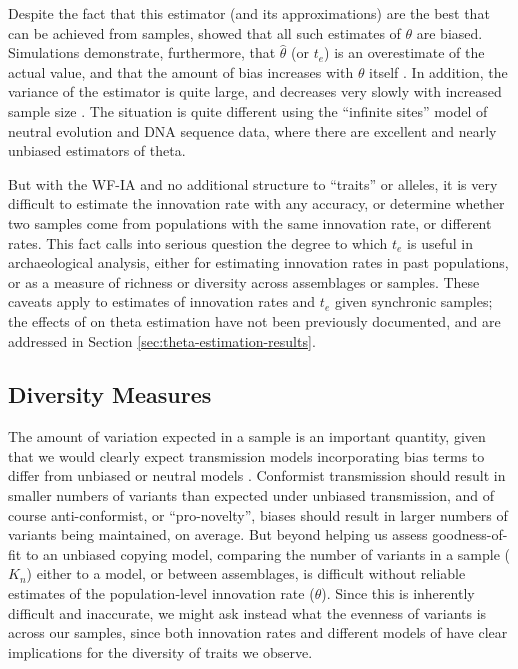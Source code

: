 Despite the fact that this estimator (and its approximations) are the best that can be achieved from samples, \citet{ewens1972sampling} showed that all such estimates of $\theta$ are biased.  Simulations demonstrate, furthermore, that $\hat{\theta}$ (or $t_e$) is an overestimate of the actual value, and that the amount of bias increases with $\theta$ itself \citep{ewens1974some}.   In addition, the variance of the estimator is quite large, and decreases very slowly with increased sample size \citep{durrett2008}.  The situation is quite different using the ``infinite sites'' model of neutral evolution and DNA sequence data, where there are excellent and nearly unbiased estimators of theta.  

But with the WF-IA and no additional structure to ``traits'' or alleles, it is very difficult to estimate the innovation rate with any accuracy, or determine whether two samples come from populations with the same innovation rate, or different rates.  This fact calls into serious question the degree to which $t_e$ is useful in archaeological analysis, either for estimating innovation rates in past populations, or as a measure of richness or diversity across assemblages or samples.  These caveats apply to estimates of innovation rates and $t_e$ given synchronic samples; the effects of \timeav on theta estimation have not been previously documented, and are addressed in Section \ref{sec:theta-estimation-results}.  

   
\subsection{Diversity Measures}

The amount of variation expected in a sample is an important quantity, given that we would clearly expect transmission models incorporating bias terms to differ from unbiased or neutral models \citep[e.g.][]{8977}.  Conformist transmission should result in smaller numbers of variants than expected under unbiased transmission, and of course anti-conformist, or ``pro-novelty'', biases should result in larger numbers of variants being maintained, on average.  But beyond helping us assess goodness-of-fit to an unbiased copying model, comparing the number of variants in a sample ($K_n$) either to a model, or between assemblages, is difficult without reliable estimates of the population-level innovation rate ($\theta$).  Since this is inherently difficult and inaccurate, we might ask instead what the evenness of variants is across our samples, since both innovation rates and different models of \ct have clear implications for the diversity of traits we observe.  


